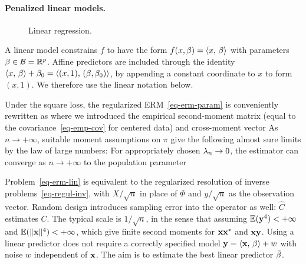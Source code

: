 \paragraph{Penalized linear models.}

\begin{figure}[tbp]
\centering
{}
\caption{Linear regression.}
\label{fig-review-ml-linear-fit}
\end{figure}
A linear model constrains $f$ to have the form $f(x,\beta)=\langle x,\,\beta\rangle$ with parameters $\beta \in \mathcal{B}=\mathbb{R}^p$. Affine predictors are included through the identity $\langle x,\,\beta\rangle+\beta_0=\langle (x,1),\,(\beta,\beta_0)\rangle$, by appending a constant coordinate to $x$ to form $(x,1)$. We therefore use the linear notation below.

Under the square loss, the regularized ERM~\eqref{eq-erm-param} is conveniently rewritten as 
where we introduced the empirical second-moment matrix (equal to the covariance~\eqref{eq-emp-cov} for centered data) and cross-moment vector
As $n\to+\infty$, suitable moment assumptions on $\pi$ give the following almost sure limits by the law of large numbers:
For appropriately chosen $\lambda_n \rightarrow 0$, the estimator can converge as $n \rightarrow +\infty$ to the population parameter

Problem~\eqref{eq-erm-lin} is equivalent to the regularized resolution of inverse problems~\eqref{eq-regul-inv}, with $X/\sqrt n$ in place of $\Phi$ and $y/\sqrt n$ as the observation vector.
%
Random design introduces sampling error into the operator as well: $\hat C$ estimates $C$. The typical scale is $1/\sqrt{n}$, in the sense that
assuming $\mathbb{E}(\mathbf{y}^4)<+\infty$ and $\mathbb{E}(\lVert\mathbf{x}\rVert^4)<+\infty$, which give finite second moments for $\mathbf{x}\mathbf{x}^*$ and $\mathbf{x}\mathbf{y}$. Using a linear predictor does not require a correctly specified model $\mathbf{y}=\langle \mathbf{x},\,\beta\rangle + w$ with noise $w$ independent of $\mathbf{x}$. The aim is to estimate the best linear predictor $\bar{\beta}$.

